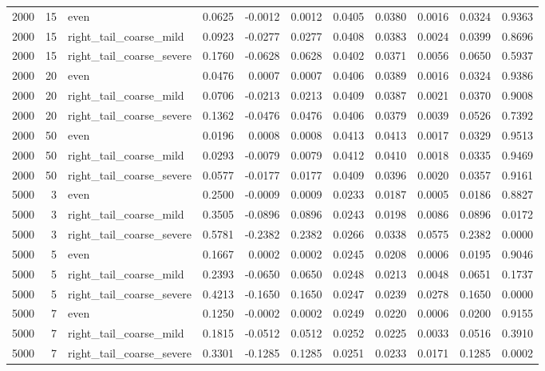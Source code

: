 \begin{table}[!h]
{\begin{tabular}[t]{rrlrrrrrrrr}
2000 & 15 & even & 0.0625 & -0.0012 & 0.0012 & 0.0405 & 0.0380 & 0.0016 & 0.0324 & 0.9363\\
2000 & 15 & right\_tail\_coarse\_mild & 0.0923 & -0.0277 & 0.0277 & 0.0408 & 0.0383 & 0.0024 & 0.0399 & 0.8696\\
2000 & 15 & right\_tail\_coarse\_severe & 0.1760 & -0.0628 & 0.0628 & 0.0402 & 0.0371 & 0.0056 & 0.0650 & 0.5937\\
2000 & 20 & even & 0.0476 & 0.0007 & 0.0007 & 0.0406 & 0.0389 & 0.0016 & 0.0324 & 0.9386\\
2000 & 20 & right\_tail\_coarse\_mild & 0.0706 & -0.0213 & 0.0213 & 0.0409 & 0.0387 & 0.0021 & 0.0370 & 0.9008\\
2000 & 20 & right\_tail\_coarse\_severe & 0.1362 & -0.0476 & 0.0476 & 0.0406 & 0.0379 & 0.0039 & 0.0526 & 0.7392\\
2000 & 50 & even & 0.0196 & 0.0008 & 0.0008 & 0.0413 & 0.0413 & 0.0017 & 0.0329 & 0.9513\\
2000 & 50 & right\_tail\_coarse\_mild & 0.0293 & -0.0079 & 0.0079 & 0.0412 & 0.0410 & 0.0018 & 0.0335 & 0.9469\\
2000 & 50 & right\_tail\_coarse\_severe & 0.0577 & -0.0177 & 0.0177 & 0.0409 & 0.0396 & 0.0020 & 0.0357 & 0.9161\\
5000 & 3 & even & 0.2500 & -0.0009 & 0.0009 & 0.0233 & 0.0187 & 0.0005 & 0.0186 & 0.8827\\
5000 & 3 & right\_tail\_coarse\_mild & 0.3505 & -0.0896 & 0.0896 & 0.0243 & 0.0198 & 0.0086 & 0.0896 & 0.0172\\
5000 & 3 & right\_tail\_coarse\_severe & 0.5781 & -0.2382 & 0.2382 & 0.0266 & 0.0338 & 0.0575 & 0.2382 & 0.0000\\
5000 & 5 & even & 0.1667 & 0.0002 & 0.0002 & 0.0245 & 0.0208 & 0.0006 & 0.0195 & 0.9046\\
5000 & 5 & right\_tail\_coarse\_mild & 0.2393 & -0.0650 & 0.0650 & 0.0248 & 0.0213 & 0.0048 & 0.0651 & 0.1737\\
5000 & 5 & right\_tail\_coarse\_severe & 0.4213 & -0.1650 & 0.1650 & 0.0247 & 0.0239 & 0.0278 & 0.1650 & 0.0000\\
5000 & 7 & even & 0.1250 & -0.0002 & 0.0002 & 0.0249 & 0.0220 & 0.0006 & 0.0200 & 0.9155\\
5000 & 7 & right\_tail\_coarse\_mild & 0.1815 & -0.0512 & 0.0512 & 0.0252 & 0.0225 & 0.0033 & 0.0516 & 0.3910\\
5000 & 7 & right\_tail\_coarse\_severe & 0.3301 & -0.1285 & 0.1285 & 0.0251 & 0.0233 & 0.0171 & 0.1285 & 0.0002\\

\end{tabular}}
\end{table}
